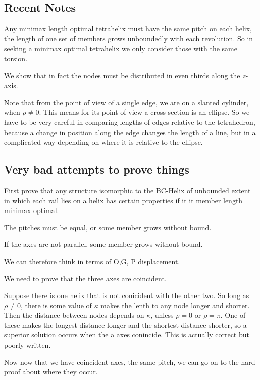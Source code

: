 \documentclass[11pt]{article}
\begin{document}
 \subsection{Recent Notes}

 Any minimax length optimal tetrahelix must have the same pitch on each helix, the length of one set of members grows unboundedly with
 each revolution. So in seeking a minimax optimal tetrahelix we only consider those with the same torsion.

 We show that in fact the nodes must be distributed in even thirds along the $z$-axis.

 Note that from the point of view of a single edge, we are on a slanted cylinder, when $\rho \neq 0$.
 This means for its point of view a cross section is an ellipse. So we have to be very careful in
 comparing lengths of edges relative to the tetrahedron, because a change in position along the edge
 changes the length of a line, but in a complicated way depending on where it is relative to the ellipse.

 \subsection{Very bad attempts to prove things}

 First prove that any structure isomorphic to the BC-Helix of unbounded extent in which each rail lies on a helix has certain
 properties if it it member length minimax optimal.

 The pitches must be equal, or some member grows without bound.

 If the axes are not parallel, some member grows without bound.

 We can therefore think in terms of O,G, P displacement.

 We need to prove that the three axes are coincident.

 Suppose there is one helix that is not conicident with the other two.  So long as $\rho \neq 0$, there is some value of $\kappa$
 makes the lenth to any node longer and shorter. Then the distance between nodes depends on $\kappa$, unless $\rho = 0$ or $\rho = \pi$.
 One of these makes the longest distance longer and the shortest distance shorter, so a superior solution occurs when the a
 axes conincide.  This is actually correct but poorly written.

 Now now that we have coincident axes, the same pitch, we can go on to the hard proof about where they occur.
\end{document}
